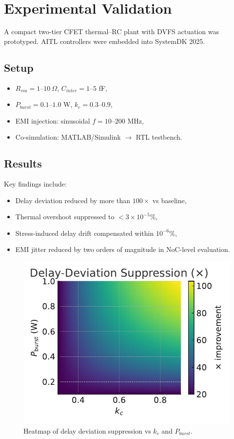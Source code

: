 \documentclass[conference]{IEEEtran}
\begin{document}
\section{Experimental Validation}
A compact two-tier CFET thermal–RC plant with DVFS actuation was prototyped.  
AITL controllers were embedded into SystemDK 2025.

\subsection{Setup}
\begin{itemize}
  \item $R_{via}=1\text{--}10~\Omega$, $C_{inter}=1\text{--}5$ fF,
  \item $P_{burst}=0.1\text{--}1.0$ W, $k_c=0.3\text{--}0.9$,
  \item EMI injection: sinusoidal $f=10\text{--}200$ MHz,
  \item Co-simulation: MATLAB/Simulink $\to$ RTL testbench.
\end{itemize}

\subsection{Results}
Key findings include:
\begin{itemize}
  \item Delay deviation reduced by more than $100\times$ vs baseline,
  \item Thermal overshoot suppressed to $<3\times 10^{-5}\%$,
  \item Stress-induced delay drift compensated within $10^{-6}\%$,
  \item EMI jitter reduced by two orders of magnitude in NoC-level evaluation.
\end{itemize}

\begin{figure}[h]
\centering
\includegraphics[width=0.85\columnwidth]{heatmap_results.pdf}
\caption{Heatmap of delay deviation suppression vs $k_c$ and $P_{burst}$.}
\label{fig:heatmap}
\end{figure}
\end{document}
